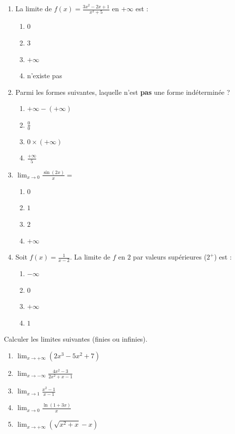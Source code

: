 \documentclass[11pt]{article}
\begin{document}
\begin{exercice}
\begin{enumerate}
    \item La limite de $f(x)=\frac{3x^2-2x+1}{x^2+5}$ en $+\infty$ est :
    \begin{enumerate}
        \item $0$
        \item $3$
        \item $+\infty$
        \item n'existe pas
    \end{enumerate}
    \item Parmi les formes suivantes, laquelle n'est \textbf{pas} une forme indéterminée ?
    \begin{enumerate}
        \item $+\infty - (+\infty)$
        \item $\frac{0}{0}$
        \item $0 \times (+\infty)$
        \item $\frac{+\infty}{5}$
    \end{enumerate}
    \item $\lim_{x\to 0}\frac{\sin(2x)}{x} = $
    \begin{enumerate}
        \item $0$
        \item $1$
        \item $2$
        \item $+\infty$
    \end{enumerate}
    \item Soit $f(x)=\frac{1}{x-2}$. La limite de $f$ en $2$ par valeurs supérieures ($2^+$) est :
    \begin{enumerate}
        \item $-\infty$
        \item $0$
        \item $+\infty$
        \item $1$
    \end{enumerate}
\end{enumerate}
\end{exercice}

\begin{exercice}
Calculer les limites suivantes (finies ou infinies).
\begin{enumerate}
    \item $\lim_{x\to +\infty}\left(2x^3-5x^2+7\right)$
    \item $\lim_{x\to -\infty}\frac{4x^2-3}{2x^2+x-1}$
    \item $\lim_{x\to 1}\frac{x^2-1}{x-1}$
    \item $\lim_{x\to 0}\frac{\ln(1+3x)}{x}$
    \item $\lim_{x\to +\infty}\left(\sqrt{x^2+x}-x\right)$
\end{enumerate}
\end{exercice}
\end{document}
